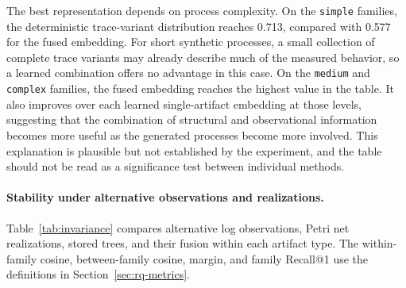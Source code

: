 \documentclass[mathematics,article,submit,moreauthors]{Definitions/mdpi}
\begin{document}
The best representation depends on process complexity. On the \texttt{simple} families, the deterministic trace-variant distribution reaches 0.713, compared with 0.577 for the fused embedding. For short synthetic processes, a small collection of complete trace variants may already describe much of the measured behavior, so a learned combination offers no advantage in this case. On the \texttt{medium} and \texttt{complex} families, the fused embedding reaches the highest value in the table. It also improves over each learned single-artifact embedding at those levels, suggesting that the combination of structural and observational information becomes more useful as the generated processes become more involved. This explanation is plausible but not established by the experiment, and the table should not be read as a significance test between individual methods.

\paragraph{Stability under alternative observations and realizations.}
Table~\ref{tab:invariance} compares alternative log observations, Petri net realizations, stored trees, and their fusion within each artifact type. The within-family cosine, between-family cosine, margin, and family Recall@1 use the definitions in Section~\ref{sec:rq-metrics}.
\end{document}
